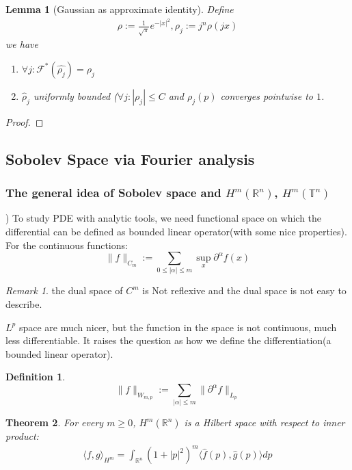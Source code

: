 \documentclass[a4paper,11pt,fleqn]{book}
\newtheorem{theorem}{Theorem}[section]
\newtheorem{lemma}[theorem]{Lemma}
\theoremstyle{definition}
\newtheorem{definition}{Definition}[section]
\theoremstyle{remark}
\newtheorem*{remark}{Remark}
\begin{document}
\begin{lemma}[Gaussian as approximate identity]
	Define
	\begin{align*}
		\rho:= \frac{1}{\sqrt{\pi}} e^{-|x|^2}, \rho_j:= j^n \rho(jx)
	\end{align*}
	we have
	\begin{enumerate}
		\item $\forall j: \mathcal {F}^*(\hat{\rho_j}) = \rho_j$
		\item $\hat{\rho}_j$ uniformly bounded ($\forall j:|\rho_j| \le C$ and $\rho_j(p)$ converges pointwise to $1$. 
	\end{enumerate}
\end{lemma}
\begin{proof}
\end{proof}




\subsection{Sobolev Space via Fourier analysis}
\subsubsection{The general idea of Sobolev space and $H^m(\mathbb{R}^n)$, $H^m(\mathbb{T}^n)$})
To study PDE with analytic tools, we need functional space on which the differential can be defined as bounded linear operator(with some nice properties). For the continuous functions:  
\begin{equation*}
	\|f\|_{C_m} := \sum_{0 \leq |\alpha| \leq m} \sup_x \partial^\alpha f(x)
\end{equation*}
\begin{remark}
the dual space of $C^m$ is Not reflexive and the dual space is not easy to describe.	
\end{remark}

$L^p$ space are much nicer, but the function in the space is not continuous, much less differentiable. It raises the question as how we define the differentiation(a bounded linear operator).

\begin{definition}
	\begin{equation*}
		\|f\|_{W_{m, p}} := \sum_{|\alpha| \leq m } \|\partial^\alpha f\|_{L_p}
	\end{equation*}
\end{definition}

\begin{theorem}
	For every $m \geq 0$, $H^m(\mathbb{R}^n)$ is a Hilbert space with respect to inner product:
	\begin{align*}
		\langle f, g \rangle_{H^m} = \int_{\mathbb{R}^n}( 1 + |p|^2)^m
		\langle \hat{f}(p), \hat{g}(p) \rangle dp
	\end{align*}
\end{theorem}
\end{document}
